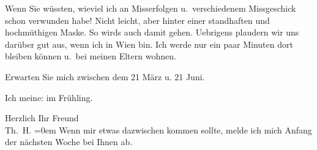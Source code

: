 \pstart
           Wenn Sie wüssten, wieviel ich an Misserfolgen u. verschiedenem Missgeschick schon
               verwunden habe! Nicht leicht, aber hinter einer standhaften und hochmüthigen Maske.
               So wirds auch damit gehen. Uebrigens plaudern wir uns darüber gut aus, wenn ich in
                  Wien bin. Ich werde  nur ein paar Minuten dort {\pb}bleiben können u. bei meinen Eltern wohnen.\pend
           
\pstart
           Erwarten Sie mich zwischen dem 21 März u. 21 Juni.\pend
           
\pstart
           Ich meine: im Frühling.\pend
           
\pstart
           Herzlich Ihr Freund{\\[\baselineskip]}\spacefill\mbox{Th. H.}\pend
           \leftskip=0em{}
\pstart
           \noindent{}Wenn mir etwas dazwischen kommen sollte, melde ich mich Anfang der nächsten Woche bei Ihnen ab.\pend
           \endnumbering{}
\begin{anhang}
\end{anhang}\newcommand{\dateiname}{L03853}\newcommand{\titel}{Theodor Herzl an Arthur Schnitzler, [zwischen 8. und 17. 3. 1895?]}\newcommand{\editorInnen}{Herausgegeben von Jahnke, SelmaMüller, Martin Anton}
